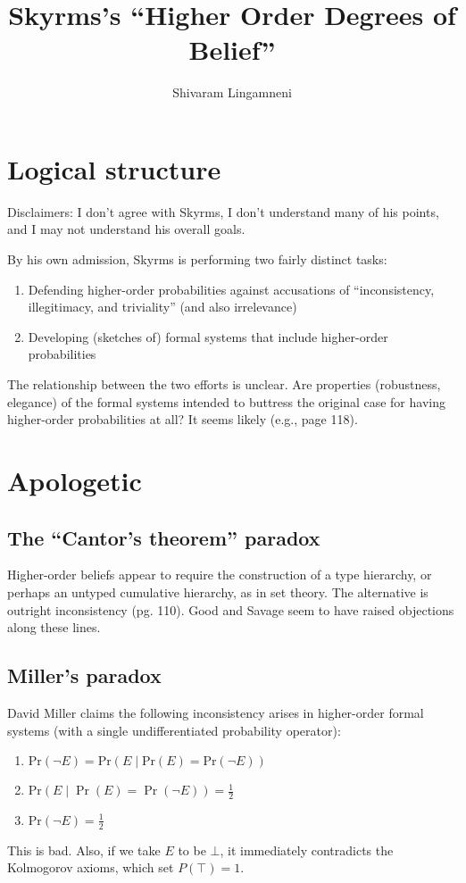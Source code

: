 \documentclass[letterpaper,12pt]{article}
\newcommand{\Prob}{\text{Pr}}
\begin{document}
\title{Skyrms's ``Higher Order Degrees of Belief''}
\author{Shivaram Lingamneni}
\maketitle

\section{Logical structure}
Disclaimers: I don't agree with Skyrms, I don't understand many of his points, and I may not understand his overall goals.

By his own admission, Skyrms is performing two fairly distinct tasks:
\begin{enumerate}
\item
Defending higher-order probabilities against accusations of ``inconsistency, illegitimacy, and triviality'' (and also irrelevance)
\item
Developing (sketches of) formal systems that include higher-order probabilities
\end{enumerate}
The relationship between the two efforts is unclear. Are properties (robustness, elegance) of the formal systems intended to buttress the original case for having higher-order probabilities at all? It seems likely (e.g., page 118).

\section{Apologetic}
\subsection{The ``Cantor's theorem'' paradox}
Higher-order beliefs appear to require the construction of a type hierarchy, or perhaps an untyped cumulative hierarchy, as in set theory. The alternative is outright inconsistency (pg. 110). Good and Savage seem to have raised objections along these lines.
\subsection{Miller's paradox}
David Miller claims the following inconsistency arises in higher-order formal systems (with a single undifferentiated probability operator):
\begin{enumerate}
\item
$\Prob(\neg E) = \Prob(E \mid \Prob(E) = \Prob(\neg E))$
\item
$\Prob(E \mid \Pr(E) = \Pr(\neg E)) = \frac{1}{2}$
\item
$\Prob(\neg E) = \frac{1}{2}$
\end{enumerate}
This is bad. Also, if we take $E$ to be $\bot$, it immediately contradicts the Kolmogorov axioms, which set $P(\top) = 1$.
	
\end{document}
